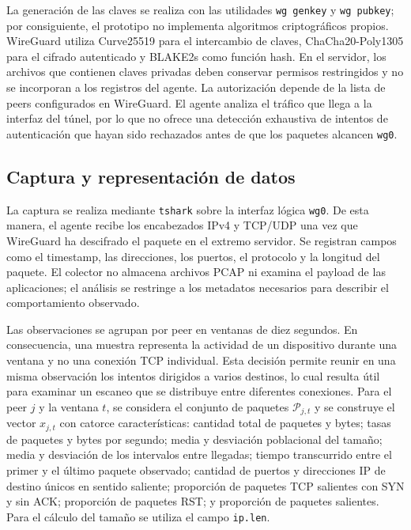 \documentclass[conference]{IEEEtran}
\begin{document}
La generación de las claves se realiza con las utilidades \texttt{wg genkey} y \texttt{wg pubkey}; por consiguiente, el prototipo no implementa algoritmos criptográficos propios. WireGuard utiliza Curve25519 para el intercambio de claves, ChaCha20-Poly1305 para el cifrado autenticado y BLAKE2s como función hash. En el servidor, los archivos que contienen claves privadas deben conservar permisos restringidos y no se incorporan a los registros del agente. La autorización depende de la lista de peers configurados en WireGuard. El agente analiza el tráfico que llega a la interfaz del túnel, por lo que no ofrece una detección exhaustiva de intentos de autenticación que hayan sido rechazados antes de que los paquetes alcancen \texttt{wg0}.

\subsection{Captura y representación de datos}
La captura se realiza mediante \texttt{tshark} sobre la interfaz lógica \texttt{wg0}. De esta manera, el agente recibe los encabezados IPv4 y TCP/UDP una vez que WireGuard ha descifrado el paquete en el extremo servidor. Se registran campos como el timestamp, las direcciones, los puertos, el protocolo y la longitud del paquete. El colector no almacena archivos PCAP ni examina el payload de las aplicaciones; el análisis se restringe a los metadatos necesarios para describir el comportamiento observado.

Las observaciones se agrupan por peer en ventanas de diez segundos. En consecuencia, una muestra representa la actividad de un dispositivo durante una ventana y no una conexión TCP individual. Esta decisión permite reunir en una misma observación los intentos dirigidos a varios destinos, lo cual resulta útil para examinar un escaneo que se distribuye entre diferentes conexiones. Para el peer $j$ y la ventana $t$, se considera el conjunto de paquetes \(\mathcal{P}_{j,t}\) y se construye el vector $x_{j,t}$ con catorce características: cantidad total de paquetes y bytes; tasas de paquetes y bytes por segundo; media y desviación poblacional del tamaño; media y desviación de los intervalos entre llegadas; tiempo transcurrido entre el primer y el último paquete observado; cantidad de puertos y direcciones IP de destino únicos en sentido saliente; proporción de paquetes TCP salientes con SYN y sin ACK; proporción de paquetes RST; y proporción de paquetes salientes. Para el cálculo del tamaño se utiliza el campo \texttt{ip.len}.
\end{document}
